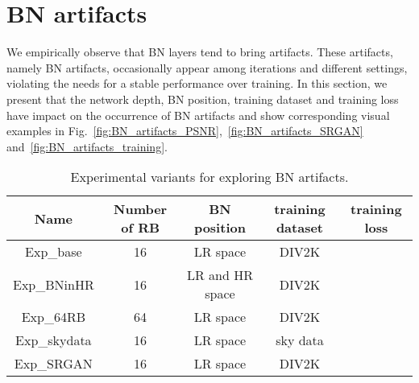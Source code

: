 \documentclass[runningheads]{llncs}
\begin{document}
\maketitle
\vspace{-0.6cm}
\begin{abstract}
	In this supplementary file, we first show more examples of Batch-Normalization (BN) related artifacts in 
	Section~\ref{sec:BN_artifacts}. 
	Then we introduce several useful techniques that facilitate training very deep models in 
	Section~\ref{sec:useful_techniques}.
	The analysis of the influence of different datasets and training patch size is depicted in 
	Section~\ref{sec:influence_datasets} and Section~\ref{sec:influence_patch_size}, respectively. 
	Finally, in Section~\ref{sec:qualitative_cmp}, we provide more qualitative results for visual comparison.
\end{abstract}

\section{BN artifacts} \label{sec:BN_artifacts}

We empirically observe that BN layers tend to bring artifacts.
These artifacts, namely BN artifacts, occasionally appear among iterations and different settings, violating the needs 
for a stable performance over training.
In this section, we present that the network depth, BN position, training dataset and training loss have impact on 
the occurrence of BN artifacts and show corresponding visual examples in 
Fig.~\ref{fig:BN_artifacts_PSNR},~\ref{fig:BN_artifacts_SRGAN} and~\ref{fig:BN_artifacts_training}.

\begin{table}[htbp]
	\vspace{-0.4cm}
\centering
	\caption{Experimental variants for exploring BN artifacts.}
	\label{tb:BN}
	\begin{tabular}{|c|c|c|c|c|}
		\hline
		Name & Number of RB & BN position & training dataset & training loss \\ \hline
		Exp\_base & 16 & LR space & DIV2K &  \\ \hline
		Exp\_BNinHR & 16 & LR and HR space & DIV2K &  \\ \hline
		Exp\_64RB & 64 & LR space & DIV2K &  \\ \hline
		Exp\_skydata & 16 & LR space & sky data &  \\ \hline
		Exp\_SRGAN & 16 & LR space & DIV2K &  \\ \hline
	\end{tabular}
	\vspace{-0.4cm}
\end{table}
\end{document}
